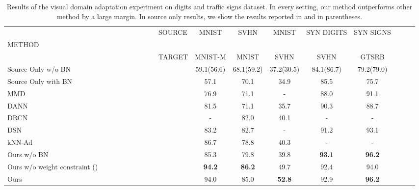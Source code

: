 \documentclass{article}
\begin{document}
\begin{table*}[t]
\begin{center}
\begin{tabular}{l|cccccccc}
\toprule
\ \ \ \ \ \ \ \ \ \ \ \ \ \ \ \ \ \ \ \ \ \ \ \ \ \ \ \ \ \ \ \ \ \ \ \ \ \ \ \ \ \ \ \ SOURCE & MNIST & SVHN &MNIST&SYN DIGITS&SYN SIGNS\\ 
METHOD&&&&&\\
\ \ \ \ \ \ \ \ \ \ \ \ \ \ \ \ \ \ \ \ \ \ \ \ \ \ \ \ \ \ \ \ \ \ \ \ \ \ \ \ \ \ \ \ TARGET & MNIST-M&MNIST &SVHN&SVHN&GTSRB\\ \midrule
Source Only w/o BN&59.1(56.6)&68.1(59.2)&37.2(30.5)&84.1(86.7)&79.2(79.0)\\
Source Only with BN&57.1&70.1&34.9&85.5&75.7\\\hline
MMD \cite{long2015learning}&76.9&71.1&-&88.0&91.1\\
DANN \cite{ganin2014unsupervised}&81.5&71.1&35.7&90.3&88.7\\
DRCN \cite{ghifary2016deep}&-&82.0&40.1&-&-\\
DSN \cite{bousmalis2016domain}&83.2&82.7&-&91.2&93.1\\
kNN-Ad \cite{sener2016learning}&86.7&78.8&40.3&-&-\\\midrule
Ours w/o BN&{85.3}&79.8&39.8&{\bf 93.1}&{\bf 96.2}\\
Ours w/o weight constraint ()&{\bf 94.2}&{\bf 86.2}&49.7&92.4&94.0\\
Ours &94.0&85.0&{\bf 52.8}&92.9&{\bf 96.2}\\\bottomrule
\end{tabular}
\caption{Results of the visual domain adaptation experiment on digits and traffic signs dataset. In every setting, our method outperforms other method by a large margin. In source only results, we show the results reported in \cite{bousmalis2016domain} and \cite{ghifary2016deep} in parentheses.} 
\label{table:exp_scratch}
\end{center}
\end{table*}
\end{document}
